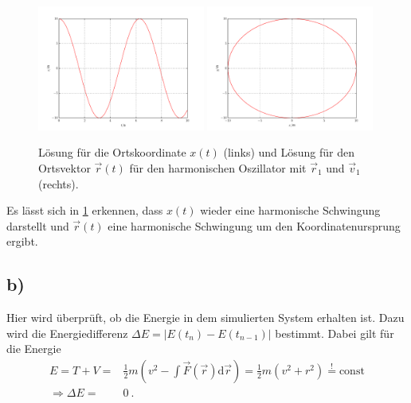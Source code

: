 \begin{figure}
	\centering
	\includegraphics[width = 0.49\textwidth]{../Plots/Plot_2_A_3}
		\includegraphics[width = 0.49\textwidth]{../Plots/Plot_2_A_2}
		\caption{Lösung für die Ortskoordinate $x(t)$ (links) und Lösung für den Ortsvektor $\vec{r}(t)$ für den harmonischen Oszillator mit $\vec{r}_1$ und $\vec{v}_1$ (rechts).\label{fig:Geschw}}
\end{figure}
Es lässt sich in \cref{fig:Geschw} erkennen, dass $x(t)$ wieder eine harmonische Schwingung darstellt und $\vec{r}(t)$ eine harmonische Schwingung um den Koordinatenursprung ergibt.
\newpage

\subsection*{b)}
Hier wird überprüft, ob die Energie in dem simulierten System erhalten ist.
Dazu wird die Energiedifferenz $\Delta E= |E(t_n)-E(t_{n-1})|$ bestimmt.
Dabei gilt für die Energie
\begin{align}
	E = T + V =& \frac{1}{2}m\left( v^2 - \int \vec{F}(\vec{r})\text{d}\vec{r} \right) =\frac{1}{2}m\left( v^2 + r^2 \right) \overset{!}{=} \text{const}\\
	\Rightarrow \Delta E =& 0~.
\end{align}

